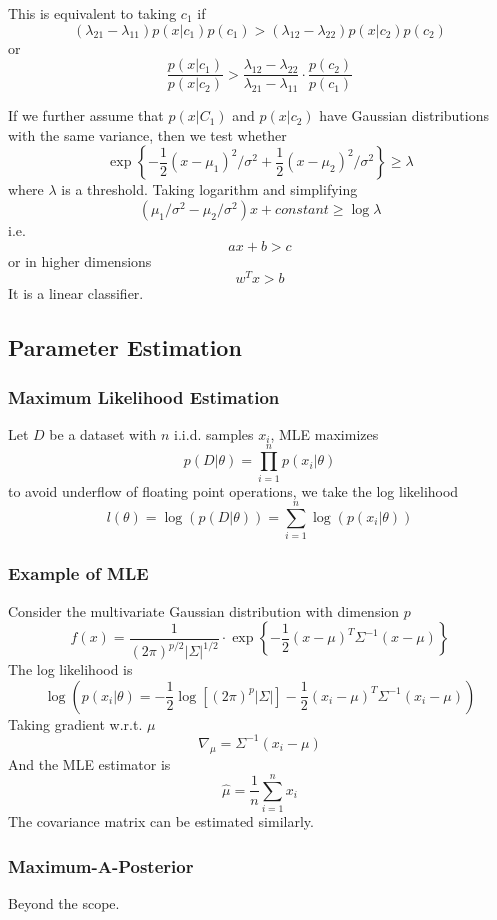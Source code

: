         This is equivalent to taking $c_1$ if
        \[ (\lambda_{21}-\lambda_{11})p(x|c_1)p(c_1) > (\lambda_{12}-\lambda_{22})p(x|c_2)p(c_2) \]
        or
        \[ \frac{p(x|c_1)}{p(x|c_2)} > \frac{\lambda_{12} - \lambda_{22}}{\lambda_{21} - \lambda_{11}} \cdot \frac{p(c_2)}{p(c_1)} \]

        If we further assume that $p(x|C_1)$ and $p(x|c_2)$ have Gaussian distributions with the same variance, then we test whether
        \[ \exp\left\{ -\frac{1}{2}(x-\mu_1)^2/\sigma^2 + \frac{1}{2}(x-\mu_2)^2/\sigma^2 \right\} \ge \lambda \]
        where $\lambda$ is a threshold.
        Taking logarithm and simplifying
        \[ (\mu_1/\sigma^2 - \mu_2/\sigma^2)x + constant \ge \log\lambda \]
        i.e.
        \[ ax+b > c \]
        or in higher dimensions
        \[ w^Tx > b \]
        It is a linear classifier.

    \subsection{Parameter Estimation}
    \subsubsection{Maximum Likelihood Estimation}
    Let $D$ be a dataset with $n$ i.i.d. samples $x_i$, MLE maximizes
    \[ p(D|\theta) = \prod_{i=1}^n p(x_i|\theta) \]
    to avoid underflow of floating point operations, we take the log likelihood
    \[ l(\theta) = \log(p(D|\theta)) = \sum_{i=1}^n \log(p(x_i|\theta)) \]
    
    \subsubsection{Example of MLE}
    Consider the multivariate Gaussian distribution with dimension $p$
    \[ f(x) = \frac{1}{(2\pi)^{p/2}|\Sigma|^{1/2}}\cdot \exp \left\{ -\frac{1}{2}(x-\mu)^T\Sigma^{-1}(x-\mu) \right\} \]
    The log likelihood is
    \[ \log\left( p(x_i|\theta) = -\frac{1}{2}\log\left[(2\pi)^p|\Sigma|\right] - \frac{1}{2}(x_i - \mu)^T\Sigma^{-1}(x_i - \mu)  \right) \]
    Taking gradient w.r.t. $\mu$
    \[ \nabla_{\mu} = \Sigma^{-1}(x_i-\mu) \]
    And the MLE estimator is
    \[ \hat{\mu} = \frac{1}{n}\sum_{i=1}^n x_i \]
    The covariance matrix can be estimated similarly.

    \subsubsection{Maximum-A-Posterior}
    Beyond the scope.

